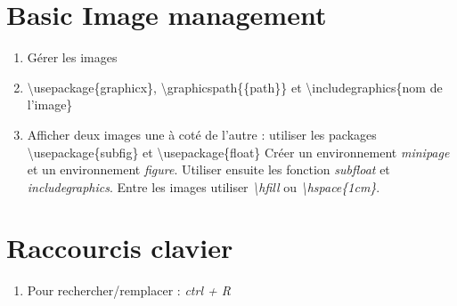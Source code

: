 \documentclass[12pt, letterpaper]{article}
\begin{document}
\section{Basic Image management}
\begin{enumerate}
\item Gérer les images
\item \textbackslash usepackage\{graphicx\}, \textbackslash graphicspath\{\{path\}\} et \textbackslash includegraphics\{nom de l'image\}
\item Afficher deux images une à coté de l'autre : utiliser les packages \textbackslash usepackage\{subfig\} et \textbackslash usepackage\{float\}
\newline Créer un environnement \textit{minipage} et un environnement \textit{figure}. Utiliser ensuite les fonction \textit{subfloat} et \textit{includegraphics}. Entre les images utiliser \textit{\textbackslash hfill} ou \textit{\textbackslash hspace\{1cm\}}.
\end{enumerate}
\begin{minipage}{\linewidth}
  \begin{figure}[H]
  \centering
    \hspace{1cm}
  \end{figure}
\end{minipage}

\section{Raccourcis clavier}
\begin{enumerate}
\item Pour rechercher/remplacer : \textit{ctrl + R}
\end{enumerate}
\end{document}
